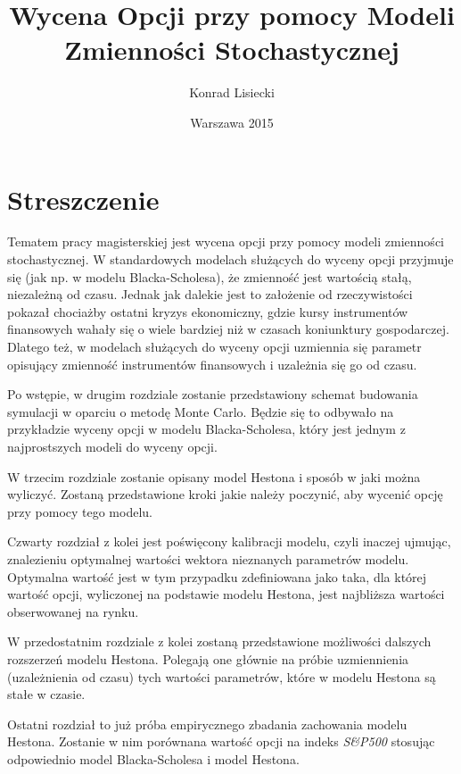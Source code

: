 \documentclass{pracamgr}
\author{Konrad Lisiecki}
\title{Wycena Opcji przy pomocy Modeli Zmienności Stochastycznej}
\date{Warszawa 2015}
\begin{document}
\maketitle
\nocite{book-full} 

\chapter*{Streszczenie} 


Tematem pracy magisterskiej jest wycena opcji przy pomocy modeli zmienności stochastycznej. 
W standardowych modelach służących do wyceny opcji przyjmuje się (jak np. w modelu 
Blacka-Scholesa), że zmienność jest wartością stałą, niezależną od czasu. 
Jednak jak dalekie jest to założenie od rzeczywistości pokazał chociażby ostatni kryzys 
ekonomiczny, gdzie kursy instrumentów finansowych wahały się o wiele bardziej niż w czasach
koniunktury gospodarczej. Dlatego też, w modelach służących do wyceny opcji uzmiennia się parametr opisujący zmienność instrumentów finansowych i uzależnia się go od czasu. 


Po wstępie, w drugim rozdziale zostanie przedstawiony schemat budowania symulacji w oparciu o metodę Monte Carlo. Będzie się to odbywało na przykładzie wyceny opcji w modelu Blacka-Scholesa, który 
jest jednym z najprostszych modeli do wyceny opcji.

W trzecim rozdziale zostanie opisany model Hestona i sposób w jaki można wyliczyć. 
Zostaną przedstawione kroki jakie należy poczynić, aby wycenić opcję przy pomocy tego modelu.

Czwarty rozdział z kolei jest poświęcony kalibracji modelu, czyli inaczej ujmując, znalezieniu 
optymalnej wartości wektora nieznanych parametrów modelu. Optymalna wartość jest w tym przypadku zdefiniowana
jako taka, dla której wartość opcji, wyliczonej na podstawie modelu Hestona, jest najbliższa wartości 
obserwowanej na rynku.

W przedostatnim rozdziale z kolei zostaną przedstawione możliwości dalszych rozszerzeń modelu Hestona. 
Polegają one głównie na próbie uzmiennienia (uzależnienia od czasu) tych wartości parametrów, które w 
modelu Hestona są stałe w czasie.

Ostatni rozdział to już próba empirycznego zbadania zachowania modelu Hestona. Zostanie w nim porównana
wartość opcji na indeks \textit{S\&P500} stosując odpowiednio model Blacka-Scholesa i model Hestona.
\end{document}
